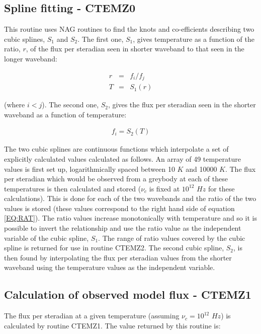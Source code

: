\subsection{Spline fitting - CTEMZ0}
This routine uses {\small NAG} routines to find the knots and co-efficients
describing two cubic splines, $S_{1}$ and $S_{2}$. The first one, $S_{1}$, gives
temperature as a function of the ratio, $r$, of the flux per steradian seen in
shorter waveband to that seen in the longer waveband:

\begin{eqnarray*}
r & = & f_{i}/f_{j}\\
T & = & S_{1}( r )
\end{eqnarray*}

(where $i<j$). The second one, $S_{2}$, gives the flux per steradian seen in the
shorter waveband as a function of temperature:

\begin{eqnarray*}
f_{i} = S_{2}( T )
\end{eqnarray*}

The two cubic splines are continuous functions which interpolate a set of
explicitly calculated values calculated as follows. An array of 49 temperature
values is first set up, logarithmically spaced between 10 $K$ and 10000 $K$. The
flux per steradian which would be observed from a greybody at each of these
temperatures is then calculated and stored ($\nu_c$ is fixed at $10^{12}$ $Hz$ for
these calculations). This is done for each of the two wavebands and the ratio of
the two values is stored (these values correspond to the right hand side of
equation \ref{EQ:RAT}). The ratio values increase monotonically with temperature
and so it is possible to invert the relationship and use the ratio value as the
independent variable of the cubic spline, $S_{1}$. The range of ratio values
covered by the cubic spline is returned for use in routine {\small CTEMZ2}. The
second cubic spline, $S_{2}$, is then found by interpolating the flux per
steradian values from the shorter waveband using the temperature values as the
independent variable.

\subsection{Calculation of observed model flux - CTEMZ1}
The flux per steradian at a given temperature (assuming $\nu_{c}=10^{12}$ $Hz$)
is calculated by routine {\small CTEMZ1}. The value returned by this routine is:

